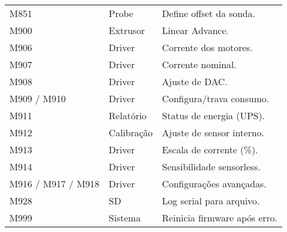 \begin{longtable}{|l|l|p{\funcwidth}|}
			M851 & Probe & Define offset da sonda. \\
			M900 & Extrusor & Linear Advance. \\
			M906 & Driver & Corrente dos motores. \\
			M907 & Driver & Corrente nominal. \\
			M908 & Driver & Ajuste de DAC. \\
			M909 / M910 & Driver & Configura/trava consumo. \\
			M911 & Relatório & Status de energia (UPS). \\
			M912 & Calibração & Ajuste de sensor interno. \\
			M913 & Driver & Escala de corrente (\%). \\
			M914 & Driver & Sensibilidade sensorless. \\
			M916 / M917 / M918 & Driver & Configurações avançadas. \\
			M928 & SD & Log serial para arquivo. \\
			M999 & Sistema & Reinicia firmware após erro. \\
			\hline
			
		\end{longtable}
		

